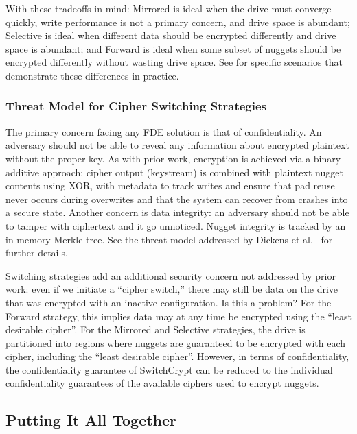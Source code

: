 With these tradeoffs in mind: Mirrored is ideal when the drive must converge
quickly, write performance is not a primary concern, and drive space is
abundant; Selective is ideal when different data should be encrypted differently
and drive space is abundant; and Forward is ideal when some subset of nuggets
should be encrypted differently without wasting drive space. See
 for specific scenarios that demonstrate these differences in
practice.

\subsubsection{Threat Model for Cipher Switching Strategies}

The primary concern facing any FDE solution is that of confidentiality. An
adversary should not be able to reveal any information about encrypted plaintext
without the proper key. As with prior work, encryption is achieved via a binary
additive approach: cipher output (keystream) is combined with plaintext nugget
contents using XOR, with metadata to track writes and ensure that pad reuse
never occurs during overwrites and that the system can recover from crashes into
a secure state. Another concern is data integrity: an adversary should not be
able to tamper with ciphertext and it go unnoticed. Nugget integrity is tracked
by an in-memory Merkle tree. See the threat model addressed by Dickens et
al.~\cite{StrongBox} for further details.

Switching strategies add an additional security concern not addressed by prior
work: even if we initiate a ``cipher switch,'' there may still be data on the
drive that was encrypted with an inactive configuration. Is this a problem? For
the Forward strategy, this implies data may at any time be encrypted using the
``least desirable cipher''. For the Mirrored and Selective strategies, the drive
is partitioned into regions where nuggets are guaranteed to be encrypted with
each cipher, including the ``least desirable cipher''. However, in terms of
confidentiality, the confidentiality guarantee of SwitchCrypt can be reduced to
the individual confidentiality guarantees of the available ciphers used to
encrypt nuggets.

\subsection{Putting It All Together} \label{subsec:summary}

